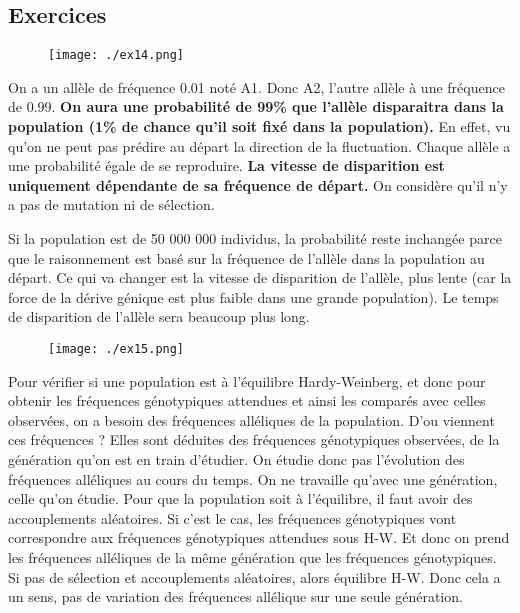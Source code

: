 \documentclass{article}
\begin{document}
\subsection{Exercices}

\begin{figure}[H]
\texttt{[image: ./ex14.png]}
\end{figure}

On a un allèle de fréquence 0.01 noté A1. Donc A2, l'autre allèle à une fréquence de 0.99. \textbf{On aura une probabilité de 99\% que l'allèle disparaitra dans la population (1\% de chance qu'il soit fixé dans la population).} En effet, vu qu'on ne peut pas prédire au départ la direction de la fluctuation. Chaque allèle a une probabilité égale de se reproduire. \textbf{La vitesse de disparition est uniquement dépendante de sa fréquence de départ.} On considère qu'il n'y a pas de mutation ni de sélection.

Si la population est de 50 000 000 individus, la probabilité reste inchangée parce que le raisonnement est basé sur la fréquence de l'allèle dans la population au départ. Ce qui va changer est la vitesse de disparition de l'allèle, plus lente (car la force de la dérive génique est plus faible dans une grande population). Le temps de disparition de l'allèle sera beaucoup plus long.


\begin{figure}[H]
\texttt{[image: ./ex15.png]}
\end{figure}

Pour vérifier si une population est à l'équilibre Hardy-Weinberg, et donc pour obtenir les fréquences génotypiques attendues et ainsi les comparés avec celles observées, on a besoin des fréquences alléliques de la population. D'ou viennent ces fréquences ? Elles sont déduites des fréquences génotypiques observées, de la génération qu'on est en train d'étudier. On étudie donc pas l'évolution des fréquences alléliques au cours du temps. On ne travaille qu'avec une génération, celle qu'on étudie. Pour que la population soit à l'équilibre, il faut avoir des accouplements aléatoires. Si c'est le cas, les fréquences génotypiques vont correspondre aux fréquences génotypiques attendues sous H-W. Et donc on prend les fréquences alléliques de la même génération que les fréquences génotypiques. Si pas de sélection et accouplements aléatoires, alors équilibre H-W. Donc cela a un sens, pas de variation des fréquences allélique sur une seule génération.

\pagebreak
\end{document}
